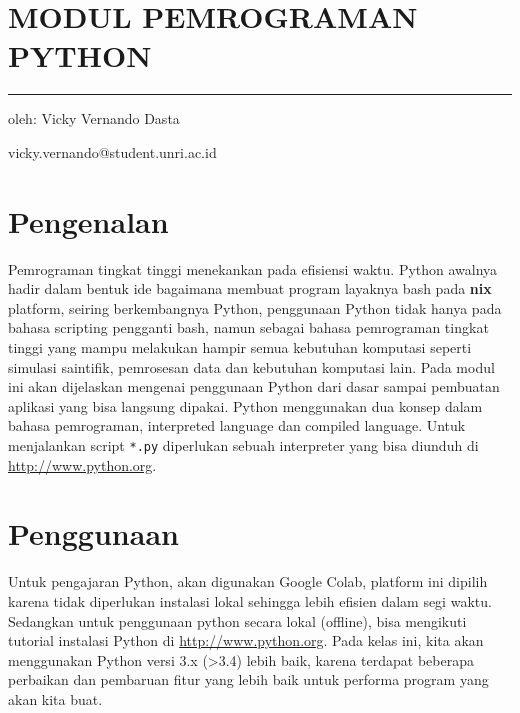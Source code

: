 \section{MODUL PEMROGRAMAN PYTHON}\label{modul-pemrograman-python}

\begin{center}\rule{0.5\linewidth}{\linethickness}\end{center}

oleh: Vicky Vernando Dasta

vicky.vernando@student.unri.ac.id

\section{}\label{section}

\section{}\label{section-1}

\section{}\label{section-2}

\section{Pengenalan}\label{pengenalan}

Pemrograman tingkat tinggi menekankan pada efisiensi waktu. Python
awalnya hadir dalam bentuk ide bagaimana membuat program layaknya bash
pada \textbf{nix} platform, seiring berkembangnya Python, penggunaan
Python tidak hanya pada bahasa scripting pengganti bash, namun sebagai
bahasa pemrograman tingkat tinggi yang mampu melakukan hampir semua
kebutuhan komputasi seperti simulasi saintifik, pemrosesan data dan
kebutuhan komputasi lain. Pada modul ini akan dijelaskan mengenai
penggunaan Python dari dasar sampai pembuatan aplikasi yang bisa
langsung dipakai. Python menggunakan dua konsep dalam bahasa
pemrograman, interpreted language dan compiled language. Untuk
menjalankan script \texttt{*.py} diperlukan sebuah interpreter yang bisa
diunduh di \url{http://www.python.org}.

\section{Penggunaan}\label{penggunaan}

Untuk pengajaran Python, akan digunakan Google Colab, platform ini
dipilih karena tidak diperlukan instalasi lokal sehingga lebih efisien
dalam segi waktu. Sedangkan untuk penggunaan python secara lokal
(offline), bisa mengikuti tutorial instalasi Python di
\url{http://www.python.org}. Pada kelas ini, kita akan menggunakan
Python versi 3.x (\textgreater{}3.4) lebih baik, karena terdapat
beberapa perbaikan dan pembaruan fitur yang lebih baik untuk performa
program yang akan kita buat.

